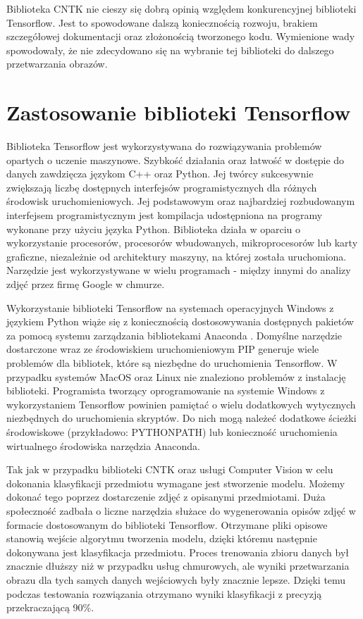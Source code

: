 {{Biblioteka CNTK nie cieszy się dobrą opinią względem konkurencyjnej biblioteki Tensorflow. Jest to spowodowane dalszą koniecznością rozwoju, brakiem szczegółowej dokumentacji oraz złożonością tworzonego kodu. Wymienione wady spowodowały, że nie zdecydowano się na wybranie tej biblioteki do dalszego przetwarzania obrazów. 
}

\section{Zastosowanie biblioteki Tensorflow}{
Biblioteka Tensorflow \cite{Tensorflow} jest wykorzystywana do rozwiązywania problemów opartych o uczenie maszynowe. Szybkość działania oraz łatwość w dostępie do danych zawdzięcza językom C++ oraz Python. Jej twórcy sukcesywnie zwiększają liczbę dostępnych interfejsów programistycznych dla różnych środowisk uruchomieniowych. Jej podstawowym oraz najbardziej rozbudowanym interfejsem programistycznym jest kompilacja udostępniona na programy wykonane przy użyciu języka Python. Biblioteka działa w oparciu o wykorzystanie procesorów, procesorów wbudowanych, mikroprocesorów lub karty graficzne, niezależnie od architektury maszyny, na której została uruchomiona. Narzędzie jest wykorzystywane w wielu programach - między innymi do analizy zdjęć przez firmę Google w chmurze. 

Wykorzystanie biblioteki Tensorflow na systemach operacyjnych Windows z językiem Python wiąże się z koniecznością dostosowywania dostępnych pakietów za pomocą systemu zarządzania bibliotekami Anaconda \cite{Anaconda}. Domyślne narzędzie dostarczone wraz ze środowiskiem uruchomieniowym PIP generuje wiele problemów dla bibliotek, które są niezbędne do uruchomienia Tensorflow. W przypadku systemów MacOS oraz Linux nie znaleziono problemów z instalację biblioteki. Programista tworzący oprogramowanie na systemie Windows z wykorzystaniem Tensorflow powinien pamiętać o wielu dodatkowych wytycznych niezbędnych do uruchomienia skryptów. Do nich mogą należeć dodatkowe ścieżki środowiskowe (przykładowo: PYTHONPATH) lub konieczność uruchomienia wirtualnego środowiska narzędzia Anaconda. 

Tak jak w przypadku biblioteki CNTK oraz usługi Computer Vision w celu dokonania klasyfikacji przedmiotu wymagane jest stworzenie modelu. Możemy dokonać tego poprzez dostarczenie zdjęć z opisanymi przedmiotami. Duża społeczność zadbała o liczne narzędzia służace do wygenerowania opisów zdjęć w formacie dostosowanym do biblioteki Tensorflow. Otrzymane pliki opisowe stanowią wejście algorytmu tworzenia modelu, dzięki któremu następnie dokonywana jest klasyfikacja przedmiotu. Proces trenowania zbioru danych był znacznie dłuższy niż w przypadku usług chmurowych, ale wyniki przetwarzania obrazu dla tych samych danych wejściowych były znacznie lepsze. Dzięki temu podczas testowania rozwiązania otrzymano wyniki klasyfikacji z precyzją przekraczającą 90\%.

}}
